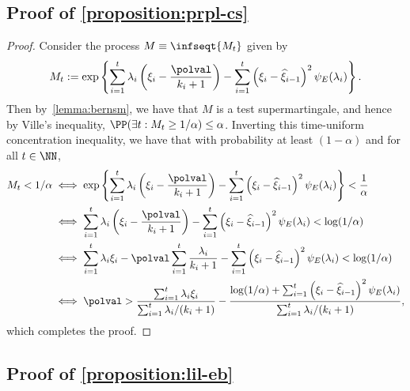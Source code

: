 \subsection{Proof of \cref{proposition:prpl-cs}}\label{proof:prpl-cs}
\begin{proof}
  Consider the process $M \equiv \infseqt{M_t}$ given by
  \begin{equation}
    M_t := \exp \left \{ \sum_{i=1}^t \lambda_i \left ( \xi_i - \frac{\polval}{k_i + 1} \right ) - \sum_{i=1}^t \left ( \xi_i - \widehat \xi_{i-1} \right )^2\psi_E(\lambda_i)  \right \}.
  \end{equation}
  Then by~\cref{lemma:bernsm}, we have that $M$ is a test supermartingale, and hence by Ville's inequality, $\PP(\exists t : M_t \geq 1/\alpha)\leq \alpha$. Inverting this time-uniform concentration inequality, we have that with probability at least $(1-\alpha)$ and for all $t \in \NN$,
  \begin{align*}
    M_t < 1/\alpha &\iff \exp \left \{ \sum_{i=1}^t \lambda_i \left ( \xi_i - \frac{\polval}{k_i + 1} \right ) - \sum_{i=1}^t \left ( \xi_i - \widehat \xi_{i-1} \right )^2\psi_E(\lambda_i)  \right \} < \frac{1}{\alpha}\\
        &\iff \sum_{i=1}^t \lambda_i \left ( \xi_i - \frac{\polval}{k_i + 1} \right ) - \sum_{i=1}^t \left ( \xi_i - \widehat \xi_{i-1} \right )^2 \psi_E(\lambda_i) < \log(1/\alpha)\\
        &\iff \sum_{i=1}^t \lambda_i\xi_i - \polval \sum_{i=1}^t \frac{\lambda_i}{k_i+1} - \sum_{i=1}^t \left ( \xi_i - \widehat \xi_{i-1} \right )^2 \psi_E(\lambda_i) < \log(1/\alpha)\\
    &\iff \polval > \frac{\sum_{i=1}^t \lambda_i \xi_i}{\sum_{i=1}^t \lambda_i / (k_i + 1)} - \frac{\log(1/\alpha) + \sum_{i=1}^t \left ( \xi_i - \widehat \xi_{i-1} \right )^2\psi_E(\lambda_i)}{\sum_{i=1}^t \lambda_i / (k_i + 1)},
  \end{align*}
  which completes the proof.
\end{proof}



\subsection{Proof of \cref{proposition:lil-eb}}\label{proof:lil-eb}


